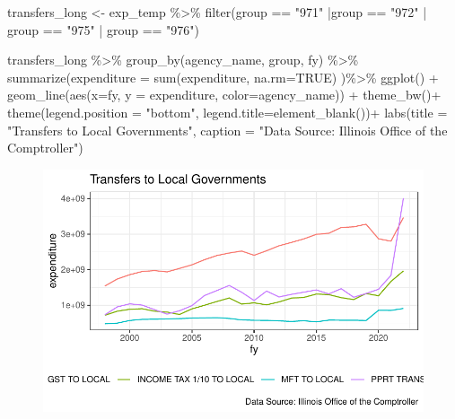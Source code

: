 \documentclass[
  letterpaper,
  DIV=11,
  numbers=noendperiod]{scrreport}
\newenvironment{Shaded}{\begin{snugshade}}{\end{snugshade}}
\newcommand{\AttributeTok}[1]{\textcolor[rgb]{0.40,0.45,0.13}{#1}}
\newcommand{\ConstantTok}[1]{\textcolor[rgb]{0.56,0.35,0.01}{#1}}
\newcommand{\FunctionTok}[1]{\textcolor[rgb]{0.28,0.35,0.67}{#1}}
\newcommand{\NormalTok}[1]{\textcolor[rgb]{0.00,0.23,0.31}{#1}}
\newcommand{\OtherTok}[1]{\textcolor[rgb]{0.00,0.23,0.31}{#1}}
\newcommand{\SpecialCharTok}[1]{\textcolor[rgb]{0.37,0.37,0.37}{#1}}
\newcommand{\StringTok}[1]{\textcolor[rgb]{0.13,0.47,0.30}{#1}}
\begin{document}
\begin{Shaded}
\begin{Highlighting}[]
\NormalTok{transfers\_long }\OtherTok{\textless{}{-}}\NormalTok{ exp\_temp }\SpecialCharTok{\%\textgreater{}\%} 
  \FunctionTok{filter}\NormalTok{(group }\SpecialCharTok{==} \StringTok{"971"} \SpecialCharTok{|}\NormalTok{group }\SpecialCharTok{==} \StringTok{"972"} \SpecialCharTok{|}\NormalTok{ group }\SpecialCharTok{==} \StringTok{"975"} \SpecialCharTok{|}\NormalTok{ group }\SpecialCharTok{==} \StringTok{"976"}\NormalTok{)}

\NormalTok{transfers\_long }\SpecialCharTok{\%\textgreater{}\%} 
  \FunctionTok{group\_by}\NormalTok{(agency\_name, group, fy) }\SpecialCharTok{\%\textgreater{}\%} 
  \FunctionTok{summarize}\NormalTok{(}\AttributeTok{expenditure =} \FunctionTok{sum}\NormalTok{(expenditure, }\AttributeTok{na.rm=}\ConstantTok{TRUE}\NormalTok{) )}\SpecialCharTok{\%\textgreater{}\%} 
  \FunctionTok{ggplot}\NormalTok{() }\SpecialCharTok{+} 
  \FunctionTok{geom\_line}\NormalTok{(}\FunctionTok{aes}\NormalTok{(}\AttributeTok{x=}\NormalTok{fy, }\AttributeTok{y =}\NormalTok{ expenditure, }\AttributeTok{color=}\NormalTok{agency\_name)) }\SpecialCharTok{+} 
  \FunctionTok{theme\_bw}\NormalTok{()}\SpecialCharTok{+}
  \FunctionTok{theme}\NormalTok{(}\AttributeTok{legend.position =} \StringTok{"bottom"}\NormalTok{, }\AttributeTok{legend.title=}\FunctionTok{element\_blank}\NormalTok{())}\SpecialCharTok{+}
  \FunctionTok{labs}\NormalTok{(}\AttributeTok{title =} \StringTok{"Transfers to Local Governments"}\NormalTok{, }
       \AttributeTok{caption =} \StringTok{"Data Source: Illinois Office of the Comptroller"}\NormalTok{)}
\end{Highlighting}
\end{Shaded}

\begin{figure}[H]

{\centering \includegraphics{./Everything_files/figure-pdf/drop-local-transfers-1.pdf}

}

\end{figure}
\end{document}
